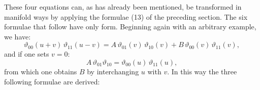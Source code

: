 
These four equations can, as has already been mentioned, be transformed in manifold ways by applying the formulae (13) of the preceding section. The six formulae that follow have only  form. Beginning again with an arbitrary example, we have:
\[
\vartheta_{00}(u+v)\,\vartheta_{11}(u-v) = A\,\vartheta_{01}(v)\,\vartheta_{10}(v) + B\,\vartheta_{00}(v)\,\vartheta_{11}(v),
\]
and if one sets $v=0$:
\[
A\,\vartheta_{01}\vartheta_{10} = \vartheta_{00}(u)\,\vartheta_{11}(u),
\]
from which one obtains $B$ by interchanging $u$ with $v$. In this way the three following formulae are derived:

